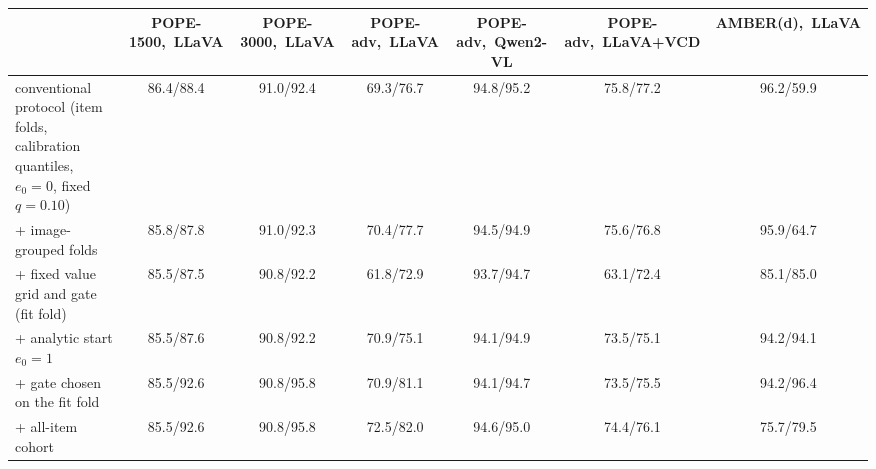\begin{tabular}{lcccccc}
\toprule
 & POPE-1500,\ LLaVA & POPE-3000,\ LLaVA & POPE-adv,\ LLaVA & POPE-adv,\ Qwen2-VL & POPE-adv,\ LLaVA+VCD & AMBER(d),\ LLaVA\\
\midrule
conventional protocol (item folds, calibration quantiles, $e_0{=}0$, fixed $q{=}0.10$) & 86.4/88.4 & 91.0/92.4 & 69.3/76.7 & 94.8/95.2 & 75.8/77.2 & 96.2/59.9\\
+ image-grouped folds & 85.8/87.8 & 91.0/92.3 & 70.4/77.7 & 94.5/94.9 & 75.6/76.8 & 95.9/64.7\\
+ fixed value grid and gate (fit fold) & 85.5/87.5 & 90.8/92.2 & 61.8/72.9 & 93.7/94.7 & 63.1/72.4 & 85.1/85.0\\
+ analytic start $e_0{=}1$ & 85.5/87.6 & 90.8/92.2 & 70.9/75.1 & 94.1/94.9 & 73.5/75.1 & 94.2/94.1\\
+ gate chosen on the fit fold & 85.5/92.6 & 90.8/95.8 & 70.9/81.1 & 94.1/94.7 & 73.5/75.5 & 94.2/96.4\\
+ all-item cohort & 85.5/92.6 & 90.8/95.8 & 72.5/82.0 & 94.6/95.0 & 74.4/76.1 & 75.7/79.5\\
\bottomrule
\end{tabular}
